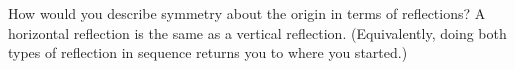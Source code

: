 {How would you describe symmetry about the origin in terms of reflections?}
{A horizontal reflection is the same as a vertical reflection. (Equivalently, doing both types of reflection in sequence returns you to where you started.)}
